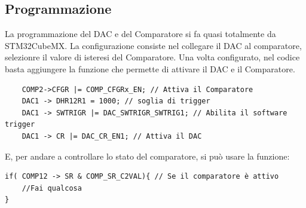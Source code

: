 \subsection{Programmazione}
La programmazione del DAC e del Comparatore si fa quasi totalmente da STM32CubeMX. La configurazione consiste nel collegare il DAC al comparatore, selezionre il valore di isteresi del Comparatore. Una volta configurato, nel codice basta aggiungere la funzione che permette di attivare il DAC e il Comparatore.\\


\begin{verbatim}
    COMP2->CFGR |= COMP_CFGRx_EN; // Attiva il Comparatore
    DAC1 -> DHR12R1 = 1000;	// soglia di trigger
	DAC1 -> SWTRIGR |= DAC_SWTRIGR_SWTRIG1; // Abilita il software trigger
	DAC1 -> CR |= DAC_CR_EN1; // Attiva il DAC
\end{verbatim}

E, per andare a controllare lo stato del comparatore, si può usare la funzione:

\begin{verbatim}
if( COMP12 -> SR & COMP_SR_C2VAL){ // Se il comparatore è attivo
    //Fai qualcosa
}
\end{verbatim}